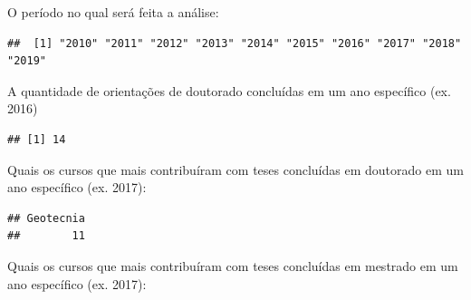 \documentclass[]{article}
\newenvironment{Shaded}{\begin{snugshade}}{\end{snugshade}}
\newcommand{\DataTypeTok}[1]{\textcolor[rgb]{0.13,0.29,0.53}{#1}}
\newcommand{\DecValTok}[1]{\textcolor[rgb]{0.00,0.00,0.81}{#1}}
\newcommand{\KeywordTok}[1]{\textcolor[rgb]{0.13,0.29,0.53}{\textbf{#1}}}
\newcommand{\NormalTok}[1]{#1}
\newcommand{\OperatorTok}[1]{\textcolor[rgb]{0.81,0.36,0.00}{\textbf{#1}}}
\newcommand{\OtherTok}[1]{\textcolor[rgb]{0.56,0.35,0.01}{#1}}
\newcommand{\StringTok}[1]{\textcolor[rgb]{0.31,0.60,0.02}{#1}}
\begin{document}
O período no qual será feita a análise:

\begin{Shaded}
\end{Shaded}

\begin{verbatim}
##  [1] "2010" "2011" "2012" "2013" "2014" "2015" "2016" "2017" "2018" "2019"
\end{verbatim}

A quantidade de orientações de doutorado concluídas em um ano específico
(ex. 2016)

\begin{Shaded}
\end{Shaded}

\begin{verbatim}
## [1] 14
\end{verbatim}

Quais os cursos que mais contribuíram com teses concluídas em doutorado
em um ano específico (ex. 2017):

\begin{Shaded}
\end{Shaded}

\begin{verbatim}
## Geotecnia 
##        11
\end{verbatim}

Quais os cursos que mais contribuíram com teses concluídas em mestrado
em um ano específico (ex. 2017):

\begin{Shaded}
\end{Shaded}
\end{document}

